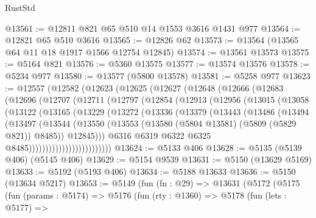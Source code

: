 \begin{lexlean}{RustStd}
\begin{coremodule}
@13561 := @12811 @821 @65 @510 @14 @1553 @3616 @1431 @977
@13564 := @12821 @65 @510 @3616
@13565 := @12826 @62
@13573 := @13564 (@13565 @64 @11 @18 @1917 @1566 @12754 @12845)
@13574 := @13561 @13573
@13575 := @5164 @821
@13576 := @5360 @13575
@13577 := @13574 @13576
@13578 := @5234 @977
@13580 := @13577 (@5800 @13578)
@13581 := @5258 @977
@13623 := @12557
    (@12582
      (@12623
        (@12625
          (@12627
            (@12648
              (@12666
                (@12683
                  (@12696
                    (@12707
                      (@12711
                        (@12797
                          (@12854
                            (@12913
                              (@12956
                                (@13015
                                  (@13058
                                    (@13122
                                      (@13165
                                        (@13229
                                          (@13272
                                            (@13336
                                              (@13379
                                                (@13443
                                                  (@13486
                                                    (@13494
                                                      (@13497
                                                        (@13544
                                                          (@13550
                                                            (@13553
                                                              (@13580
                                                                (@5804 @13581)
                                                                (@5809 (@5829 @821))
                                                                @8485))
                                                            @12845)))
                                                      @6316
                                                      @6319
                                                      @6322
                                                      @6325
                                                      @8485)))))))))))))))))))))))))
@13624 := @5133 @406
@13628 := @5135 (@5139 @406) (@5145 @406)
@13629 := @5154 @9539
@13631 := @5150 (@13629 @5169)
@13633 := @5192 (@5193 @406)
@13634 := @5188 @13633
@13636 := @5150 (@13634 @5217)
@13653 := @5149
    (fun (fn : @29) =>
    @13631
      (@5172
        (@5175
          (fun (params : @5174) =>
          @5176
            (fun (rty : @1360) =>
            @5178
              (fun (lets : @5177) =>

\end{coremodule}
\end{lexlean}
